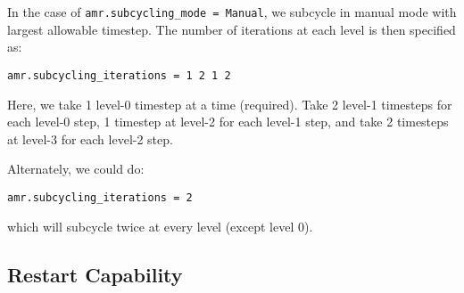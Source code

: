 In the case of {\tt amr.subcycling\_mode = Manual}, we subcycle in
manual mode with largest allowable timestep.  The number of iterations
at each level is then specified as:
\begin{lstlisting}
amr.subcycling_iterations = 1 2 1 2
\end{lstlisting}
Here, we take 1 level-0 timestep at a time (required). Take 2 level-1
timesteps for each level-0 step, 1 timestep at level-2 for each
level-1 step, and take 2 timesteps at level-3 for each level-2 step.

Alternately, we could do:
\begin{lstlisting}
amr.subcycling_iterations = 2
\end{lstlisting}
which will subcycle twice at every level (except level 0).


\subsection{Restart Capability}

